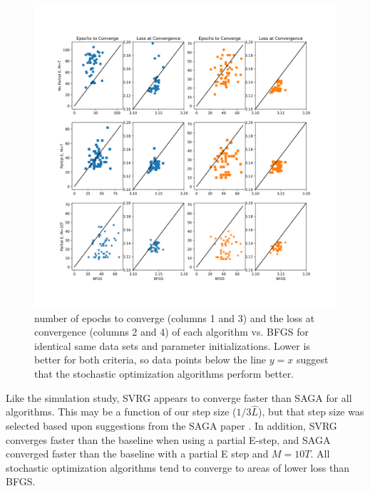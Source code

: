 \begin{figure}
    \centering
    \includegraphics[width=6.5in]{../plt/paired_scatter_case_study.png}
    \caption{number of epochs to converge (columns 1 and 3) and the loss at convergence (columns 2 and 4) of each algorithm vs. BFGS for identical same data sets and parameter initializations. Lower is better for both criteria, so data points below the line $y=x$ suggest that the stochastic optimization algorithms perform better.}
    \label{fig:scatter_case}
\end{figure}
%
Like the simulation study, SVRG appears to converge faster than SAGA for all algorithms. This may be a function of our step size ($1/3 \hat L$), but that step size was selected based upon suggestions from the SAGA paper \citep{Defazio:2014}. In addition, SVRG converges faster than the baseline when using a partial E-step, and SAGA converged faster than the baseline with a partial E step and $M=10T$. All stochastic optimization algorithms tend to converge to areas of lower loss than BFGS. 


